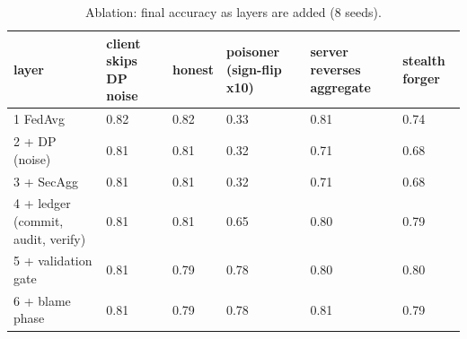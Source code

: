 \begin{table}
\caption{Ablation: final accuracy as layers are added (8 seeds).}
\label{tab:T13_ablation_accuracy}
\begin{tabular}{llllll}
\toprule
layer & client skips DP noise & honest & poisoner (sign-flip x10) & server reverses aggregate & stealth forger \\
\midrule
1 FedAvg & 0.82 & 0.82 & 0.33 & 0.81 & 0.74 \\
2 + DP (noise) & 0.81 & 0.81 & 0.32 & 0.71 & 0.68 \\
3 + SecAgg & 0.81 & 0.81 & 0.32 & 0.71 & 0.68 \\
4 + ledger (commit, audit, verify) & 0.81 & 0.81 & 0.65 & 0.80 & 0.79 \\
5 + validation gate & 0.81 & 0.79 & 0.78 & 0.80 & 0.80 \\
6 + blame phase & 0.81 & 0.79 & 0.78 & 0.81 & 0.79 \\
\bottomrule
\end{tabular}
\end{table}
